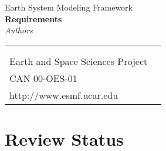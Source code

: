 \documentclass[]{article}
\begin{document}

\begin{titlepage}

\begin{center}
{\Large Earth System Modeling Framework } \\
\vspace{.25in}
{\Large {\bf <Module, Library, Component or Model Name> Requirements}} \\
\vspace{.25in}
{\large {\it Authors}}
\vspace{.5in}
\end{center}

\begin{latexonly}
\vspace{5.5in}
\begin{tabular}{p{5in}p{.9in}}
\hrulefill \\
\noindent {\bf NASA High Performance Computing and Communications Program} \\
\noindent Earth and Space Sciences Project \\
\noindent CAN 00-OES-01 \\
\noindent http://www.esmf.ucar.edu \\
\end{tabular}
\end{latexonly}

\end{titlepage}

\tableofcontents

\newpage






\section{Review Status}

 \\
\end{document}
